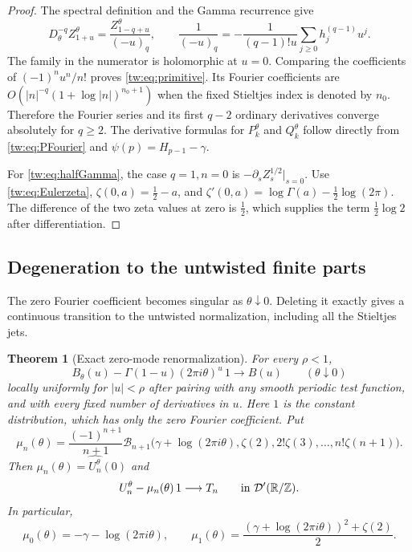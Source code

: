 \documentclass[11pt,letterpaper]{article}
\numberwithin{equation}{section}
\theoremstyle{plain}
\newtheorem{theorem}{Theorem}[section]
\theoremstyle{definition}
\theoremstyle{remark}
\begin{document}
\begin{proof}
The spectral definition and the Gamma recurrence give
\[
 D_\theta^{-q}Z_{1+u}^\theta
       =\frac{Z_{1-q+u}^\theta}{(-u)_q},\qquad
 \frac1{(-u)_q}
       =-\frac1{(q-1)!u}\sum_{j\ge0}h_j^{(q-1)}u^j.
\]
The family in the numerator is holomorphic at $u=0$. Comparing
the coefficients of $(-1)^nu^n/n!$ proves
\eqref{tw:eq:primitive}. Its Fourier coefficients are
$O(|n|^{-q}(1+\log|n|)^{n_0+1})$ when the fixed Stieltjes
index is denoted by $n_0$. Therefore the Fourier series and its
first $q-2$ ordinary derivatives converge absolutely for $q\ge2$.
The derivative formulas for $P_k^\theta$ and $Q_k^\theta$ follow
directly from \eqref{tw:eq:PFourier} and
$\psi(p)=H_{p-1}-\gamma$.

For \eqref{tw:eq:halfGamma}, the case $q=1,n=0$ is
$-\partial_s Z_s^{1/2}|_{s=0}$. Use
\eqref{tw:eq:Eulerzeta}, $\zeta(0,a)=\tfrac12-a$, and
$\zeta'(0,a)=\log\Gamma(a)-\tfrac12\log(2\pi)$.
The difference of the two zeta values at zero is $\tfrac12$,
which supplies the term $\tfrac12\log2$ after differentiation.
\end{proof}

\subsection{Degeneration to the untwisted finite parts}

The zero Fourier coefficient becomes singular as $\theta\downarrow0$.
Deleting it exactly gives a continuous transition to the untwisted
normalization, including all the Stieltjes jets.

\begin{theorem}[Exact zero-mode renormalization]
\label{tw:thm:zerolimit}
For every $\rho<1$,
\begin{equation}\label{tw:eq:Blimit}
 B_\theta(u)-\Gamma(1-u)(2\pi i\theta)^u\,1
                    \longrightarrow B(u)
 \qquad (\theta\downarrow0)
\end{equation}
locally uniformly for $|u|<\rho$ after pairing with any smooth
periodic test function, and with every fixed number of derivatives
in $u$. Here $1$ is the constant distribution, which has only the
zero Fourier coefficient. Put
\begin{equation}\label{tw:eq:meanjet}
 \mu_n(\theta)=\frac{(-1)^{n+1}}{n+1}
 \mathcal B_{n+1}\bigl(
    \gamma+\log(2\pi i\theta),\zeta(2),2!\zeta(3),
                              \ldots,n!\zeta(n+1)\bigr).
\end{equation}
Then $\mu_n(\theta)=\widehat{U_n^\theta}(0)$ and
\begin{equation}\label{tw:eq:Ulimit}
 U_n^\theta-\mu_n(\theta)\,1\longrightarrow T_n
                \qquad\hbox{in }\mathcal D'(\mathbb R/\mathbb Z).
\end{equation}
In particular,
\[
 \mu_0(\theta)=-\gamma-\log(2\pi i\theta),\qquad
 \mu_1(\theta)=\frac{(\gamma+\log(2\pi i\theta))^2+\zeta(2)}2.
\]
\end{theorem}
\end{document}
